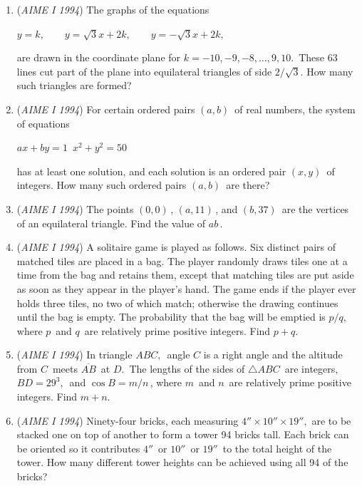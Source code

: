 \begin{enumerate}
 

	\item (\textit{AIME I 1994}) The graphs of the equations


 $y=k, \qquad y=\sqrt{3}x+2k, \qquad y=-\sqrt{3}x+2k,$

 are drawn in the coordinate plane for $k=-10,-9,-8,\ldots,9,10.\,$  These 63 lines cut part of the plane into equilateral triangles of side $2/\sqrt{3}$.  How many such triangles are formed?


 

	\item (\textit{AIME I 1994}) For certain ordered pairs $(a,b)\,$ of real numbers, the system of equations


 $ax+by=1\,$
$x^2+y^2=50\,$

 has at least one solution, and each solution is an ordered pair $(x,y)\,$ of integers.  How many such ordered pairs $(a,b)\,$ are there?


 

	\item (\textit{AIME I 1994}) The points $(0,0)\,$, $(a,11)\,$, and $(b,37)\,$ are the vertices of an equilateral triangle.  Find the value of $ab\,$.


 

	\item (\textit{AIME I 1994}) A solitaire game is played as follows.  Six distinct pairs of matched tiles are placed in a bag.  The player randomly draws tiles one at a time from the bag and retains them, except that matching tiles are put aside as soon as they appear in the player's hand.  The game ends if the player ever holds three tiles, no two of which match; otherwise the drawing continues until the bag is empty.  The probability that the bag will be emptied is $p/q,\,$ where $p\,$ and $q\,$ are relatively prime positive integers.  Find $p+q.\,$


	\item (\textit{AIME I 1994}) In triangle $ABC,\,$ angle $C$ is a right angle and the altitude from $C\,$ meets $\overline{AB}\,$ at $D.\,$  The lengths of the sides of $\triangle ABC\,$ are integers, $BD=29^3,\,$ and $\cos B=m/n\,$, where $m\,$ and $n\,$ are relatively prime positive integers.  Find $m+n.\,$


	\item (\textit{AIME I 1994}) Ninety-four bricks, each measuring $4''\times10''\times19'',$ are to be stacked one on top of another to form a tower 94 bricks tall.  Each brick can be oriented so it contributes $4''\,$ or $10''\,$ or $19''\,$ to the total height of the tower.  How many different tower heights can be achieved using all 94 of the bricks?



\end{enumerate}
